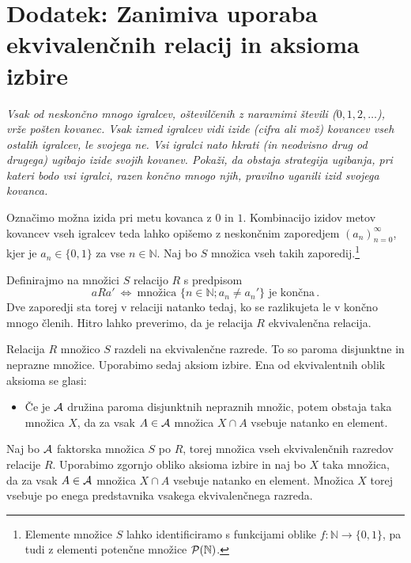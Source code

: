 \documentclass[11pt,paper=b5,footinclude,headinclude]{scrbook} %
\def\cee {{~\Leftrightarrow~}}
\begin{document}
\section{Dodatek: Zanimiva uporaba ekvivalenčnih relacij in aksioma izbire}

\emph{ Vsak od neskončno mnogo igralcev, oštevilčenih z naravnimi števili ($0,1,2,\ldots$), vrže pošten kovanec.
Vsak izmed igralcev vidi izide (cifra ali mož) kovancev vseh ostalih igralcev, le svojega ne.
Vsi igralci nato hkrati (in neodvisno drug od drugega) ugibajo izide svojih kovanev.
Pokaži, da obstaja strategija ugibanja, pri kateri bodo vsi igralci, razen končno mnogo njih, pravilno uganili izid svojega kovanca.}

\bigskip
Označimo možna izida pri metu kovanca z $0$ in $1$.  Kombinacijo izidov metov kovancev vseh igralcev teda lahko opišemo
z neskončnim zaporedjem $(a_n)_{n = 0}^\infty$, kjer je $a_n\in \{0,1\}$ za vse $n\in \mathbb{N}$.
Naj bo $S$ množica vseh takih zaporedij.\footnote{Elemente množice $S$ lahko identificiramo s funkcijami
oblike $f:\mathbb{N}\to\{0,1\}$, pa tudi z elementi potenčne množice ${\cal P}(\mathbb{N})$.}


Definirajmo na množici $S$ relacijo $R$ s predpisom
$$aRa' \cee \textrm{množica $\{n\in \mathbb{N}; a_n\neq a_n'\}$ je končna}\,.$$
Dve zaporedji sta torej v relaciji natanko tedaj, ko se razlikujeta le v končno mnogo členih.
Hitro lahko preverimo, da je relacija $R$ ekvivalenčna relacija.

Relacija $R$ množico $S$ razdeli na ekvivalenčne razrede.
To so paroma disjunktne in neprazne množice.
Uporabimo sedaj aksiom izbire. Ena od ekvivalentnih oblik aksioma se glasi:
\begin{itemize}
 \item Če je ${\cal A}$ družina paroma disjunktnih nepraznih množic, potem obstaja taka  množica $X$, da za vsak $A\in {\cal A}$ množica $X\cap A$ vsebuje natanko en element.
\end{itemize}
Naj bo ${\cal A}$ faktorska množica $S$ po $R$, torej množica vseh ekvivalenčnih razredov relacije $R$.
Uporabimo zgornjo obliko aksioma izbire in naj bo $X$ taka množica, da za vsak $A\in {\cal A}$ množica $X\cap A$ vsebuje natanko en element.
Množica $X$ torej vsebuje po enega predstavnika vsakega ekvivalenčnega razreda.
\end{document}
